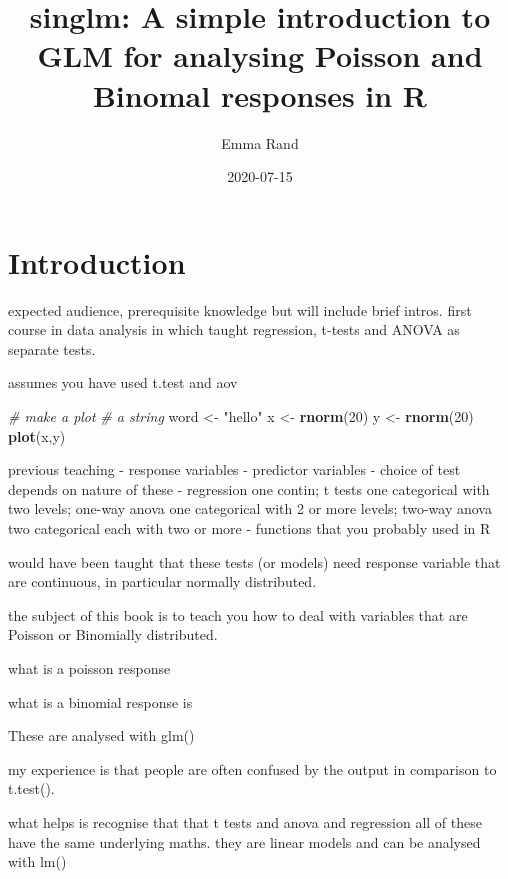 \documentclass[
]{book}
\title{singlm: A simple introduction to GLM for analysing Poisson and Binomal responses in R}
\author{Emma Rand}
\date{2020-07-15}
\newenvironment{Shaded}{\begin{snugshade}}{\end{snugshade}}
\newcommand{\CommentTok}[1]{\textcolor[rgb]{0.56,0.35,0.01}{\textit{#1}}}
\newcommand{\DecValTok}[1]{\textcolor[rgb]{0.00,0.00,0.81}{#1}}
\newcommand{\KeywordTok}[1]{\textcolor[rgb]{0.13,0.29,0.53}{\textbf{#1}}}
\newcommand{\NormalTok}[1]{#1}
\newcommand{\StringTok}[1]{\textcolor[rgb]{0.31,0.60,0.02}{#1}}
\begin{document}
\maketitle

{
\setcounter{tocdepth}{1}
\tableofcontents
}
\hypertarget{intro}{%
\chapter*{Introduction}\label{intro}}

expected audience, prerequisite knowledge but will include brief intros. first course in data analysis in which taught regression, t-tests and ANOVA as separate tests.

assumes you have used t.test and aov

\begin{Shaded}
\begin{Highlighting}[]
\CommentTok{# make a plot}
\CommentTok{# a string}
\NormalTok{word <-}\StringTok{ "hello"}
\NormalTok{x <-}\StringTok{ }\KeywordTok{rnorm}\NormalTok{(}\DecValTok{20}\NormalTok{)}
\NormalTok{y <-}\StringTok{ }\KeywordTok{rnorm}\NormalTok{(}\DecValTok{20}\NormalTok{)}
\KeywordTok{plot}\NormalTok{(x,y)}
\end{Highlighting}
\end{Shaded}

previous teaching
- response variables
- predictor variables
- choice of test depends on nature of these
- regression one contin; t tests one categorical with two levels; one-way anova one categorical with 2 or more levels; two-way anova two categorical each with two or more
- functions that you probably used in R

would have been taught that these tests (or models) need response variable that are continuous, in particular normally distributed.

the subject of this book is to teach you how to deal with variables that are Poisson or Binomially distributed.

what is a poisson response

what is a binomial response is

These are analysed with glm()

my experience is that people are often confused by the output in comparison to t.test().

what helps is recognise that that t tests and anova and regression all of these have the same underlying maths. they are linear models and can be analysed with lm()
\end{document}

